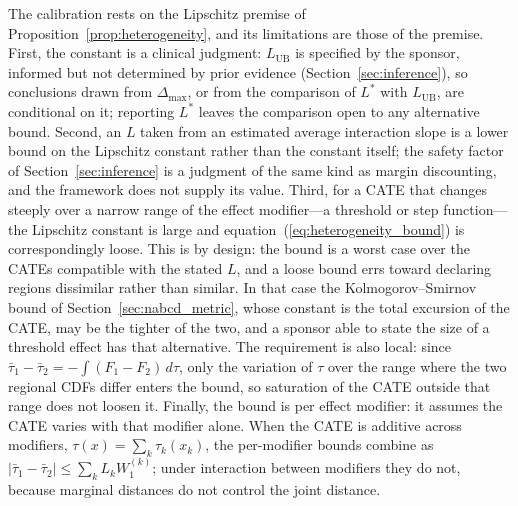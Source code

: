 \documentclass[AMA,Times1COL]{WileyNJDv5}
\begin{document}
The calibration rests on the Lipschitz premise of Proposition~\ref{prop:heterogeneity}, and its limitations are those of the premise. First, the constant is a clinical judgment: $L_{\text{UB}}$ is specified by the sponsor, informed but not determined by prior evidence (Section~\ref{sec:inference}), so conclusions drawn from $\Delta_{\max}$, or from the comparison of $L^*$ with $L_{\text{UB}}$, are conditional on it; reporting $L^*$ leaves the comparison open to any alternative bound. Second, an $L$ taken from an estimated average interaction slope is a lower bound on the Lipschitz constant rather than the constant itself; the safety factor of Section~\ref{sec:inference} is a judgment of the same kind as margin discounting, and the framework does not supply its value. Third, for a CATE that changes steeply over a narrow range of the effect modifier---a threshold or step function---the Lipschitz constant is large and equation~(\ref{eq:heterogeneity_bound}) is correspondingly loose. This is by design: the bound is a worst case over the CATEs compatible with the stated $L$, and a loose bound errs toward declaring regions dissimilar rather than similar. In that case the Kolmogorov--Smirnov bound of Section~\ref{sec:nabcd_metric}, whose constant is the total excursion of the CATE, may be the tighter of the two, and a sponsor able to state the size of a threshold effect has that alternative. The requirement is also local: since $\bar{\tau}_1 - \bar{\tau}_2 = -\int (F_1 - F_2)\,d\tau$, only the variation of $\tau$ over the range where the two regional CDFs differ enters the bound, so saturation of the CATE outside that range does not loosen it. Finally, the bound is per effect modifier: it assumes the CATE varies with that modifier alone. When the CATE is additive across modifiers, $\tau(x) = \sum_k \tau_k(x_k)$, the per-modifier bounds combine as $|\bar{\tau}_1 - \bar{\tau}_2| \leq \sum_k L_k W_1^{(k)}$; under interaction between modifiers they do not, because marginal distances do not control the joint distance.
\end{document}
